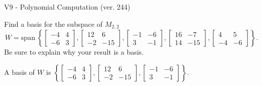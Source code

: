 \begin{exercise}
  \begin{exerciseTitle}V9 - Polynomial Computation (ver. 244)\end{exerciseTitle}
  \begin{exerciseStatement}
    Find a basis for the subspace of \(M_{2,2}\) 
\[W=\mathrm{span}\ \left\{\left[\begin{array}{cc}
-4 & 4 \\
-6 & 3
\end{array}\right] , \left[\begin{array}{cc}
12 & 6 \\
-2 & -15
\end{array}\right] , \left[\begin{array}{cc}
-1 & -6 \\
3 & -1
\end{array}\right] , \left[\begin{array}{cc}
16 & -7 \\
14 & -15
\end{array}\right] , \left[\begin{array}{cc}
4 & 5 \\
-4 & -6
\end{array}\right]\right\}.\]
 Be sure to explain why your result is a basis.


  \end{exerciseStatement}
  \begin{exerciseAnswer}
   A basis of \(W\) is  \(\left\{\left[\begin{array}{cc}
-4 & 4 \\
-6 & 3
\end{array}\right] , \left[\begin{array}{cc}
12 & 6 \\
-2 & -15
\end{array}\right] , \left[\begin{array}{cc}
-1 & -6 \\
3 & -1
\end{array}\right]\right\}\).
  


  \end{exerciseAnswer}
\end{exercise}